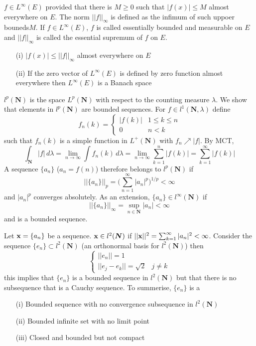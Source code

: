 \vspace{2ex}
\begin{defi}
$f\in L^{\infty }(E)$ provided that there is $M\geq 0$ such that $|f(x)|\leq M$ almost everywhere on $E$. The norm $||f||_{\infty }$ is defined as the infimum of such uppoer bouneds$ M$. If $f\in L^{\infty }(E)$, $f$ is called essentially bounded and measurable on $E$ and $||f||_{\infty }$ is called the essential supremum of $f$ on $E$. \end{defi}
\vspace{2ex}
\begin{rmk}
\begin{itemize}
\item[(i)] $|f(x)|\leq ||f||_{\infty }$ almost everywhere on $E$
\item[(ii)] If the zero vector of $L^{\infty }(E)$ is defined by zero function almost everywhere then $L^{\infty }(E)$ is a Banach space
\end{itemize}
\end{rmk}
\vspace{2ex}
\begin{defi}
$l^{p}({\bm N})$ is the space $L^{p}({\bm N})$ with respect to the counting measure $\lambda $. We show that elements in $l^{p}({\bm N})$  are bounded sequences. For $f\in l^{1}({\bm N},\lambda )$ define 
\[f_{n}(k)=\begin{cases}
|f(k)|&1\leq k\leq n\\
0&n<k
\end{cases}\]
such that $f_{n}(k)$ is a simple function in $L^{+}({\bm N})$ with $f_{n}\nearrow |f|$. By MCT, 
\[\int _{{\bm N}}|f|\,d \lambda =\lim _{n\rightarrow \infty }\int f_{n}(k)\,d \lambda =\lim _{n\rightarrow \infty }\sum ^{n }_{k=1}|f(k)|=\sum ^{\infty }_{k=1}|f(k)|\]
A sequence $\{a_{n}\}$ ($a_{n}=f(n)$) therefore belongs to $l^{p}({\bm N})$ if 
\[
||\{a_{n}\}||_{p}=\Big(\sum _{n=1}^{\infty }|a_{n}|^{p}\Big)^{1/p}<\infty \]
and $|a_{n}|^{p}$ converges absolutely. As an extension, $\{a_{n}\}\in l^{\infty }({\bm N})$ if 
\[||\{a_{n}\}||_{\infty }=\sup_{n\in {\bm N}}|a_{n}|<\infty \]
and is a bounded sequence.
\end{defi}
\vspace{2ex}
\begin{defi}
Let ${\bf x}=\{a_{n}\}$ be a sequence. ${\bf x}\in l^{2}({\bm N})$ if $||{\bf x}||^2=\sum ^{\infty }_{k=1}|a_{n}|^{2}<\infty $. Consider the sequence $\{e_{n}\}\subset l^2({\bm N})$ (an orthonormal basis for $l^2({\bm N})$) then
\[\begin{cases}
||e_{n}||=1\\
||e_{j}-e_{k}||=\sqrt{2}&j\ne k
\end{cases}\]
this implies that $\{e_{n}\}$ is a bounded sequence in $l^2({\bm N})$ but that there is no subsequence that is a Cauchy sequence. To summerise, $\{e_{n}\}$ is a 
\begin{itemize}
\item[(i)] Bounded sequence with no convergence subsequence in $l^2({\bm N})$
\item[(ii)] Bounded infinite set with no limit point
\item[(iii)] Closed and bounded but not compact 
\end{itemize}
\end{defi}
